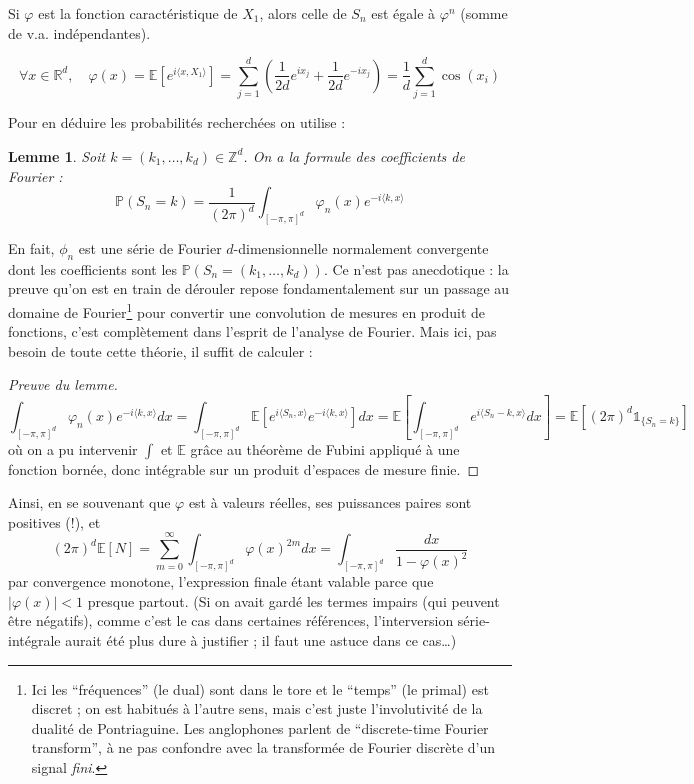 \documentclass[a4paper, 11pt]{article}
\def\Z{\mathbb{Z}}
\def\P{\mathbb{P}}
\def\R{\mathbb{R}}
\def\E{\mathbb{E}}
\def\Indic{\mathbb{1}}
\newtheorem*{lemma}{Lemme}
\begin{document}
Si $\varphi$ est la fonction caractéristique de $X_1$, alors celle de $S_n$
est égale à $\varphi^n$ (somme de v.a. indépendantes).

\[ \forall x \in \R^d,\quad \varphi(x) = \E\left[ e^{i \langle x, X_1 \rangle}
  \right]
  = \sum_{j=1}^d \left( \frac{1}{2d}e^{ix_j} + \frac{1}{2d}e^{-ix_j}\right)
  = \frac{1}{d} \sum_{j=1}^d \cos(x_i) \]

Pour en déduire les probabilités recherchées on utilise :
\begin{lemma} Soit $k = (k_1, \ldots, k_d) \in \Z^d$. On a la formule des
  coefficients de Fourier :
 \[ \displaystyle \P(S_n = k) = \frac{1}{(2\pi)^d} \int_{[-\pi,\pi]^d} \varphi_n(x)e^{-i\langle k,x \rangle} \]
\end{lemma}
En fait, $\phi_n$ est une série de Fourier $d$-dimensionnelle normalement
convergente dont les coefficients sont les $\P(S_n = (k_1, \ldots, k_d))$. Ce
n'est pas anecdotique : la preuve qu'on est en train de dérouler repose
fondamentalement sur un passage au domaine de Fourier\footnote{Ici les
  \enquote{fréquences} (le dual) sont dans le tore et le \enquote{temps} (le
  primal) est discret ; on est habitués à l'autre sens, mais c'est juste
  l'involutivité de la dualité de Pontriaguine. Les anglophones parlent de
  \enquote{discrete-time Fourier transform}, à ne pas confondre avec la
  transformée de Fourier discrète d'un signal \emph{fini}.} pour convertir une
convolution de mesures en produit de fonctions, c'est complètement dans l'esprit
de l'analyse de Fourier. Mais ici, pas besoin de toute cette théorie, il suffit
de calculer :
\begin{proof}[Preuve du lemme]
  \[ \int_{[-\pi,\pi]^d} \varphi_n(x)e^{-i\langle k,x \rangle} dx =
    \int_{[-\pi,\pi]^d} \E\left[ e^{i\langle S_n, x \rangle} e^{-i\langle k,x
        \rangle}\right] dx
    = \E\left[ \int_{[-\pi,\pi]^d} e^{i\langle S_n - k, x \rangle} dx \right]
    = \E\left[ (2\pi)^d \Indic_{\{S_n = k\}} \right] \]
  où on a pu intervenir $\int$ et $\E$ grâce au théorème de Fubini appliqué à
  une fonction bornée, donc intégrable sur un produit d'espaces de mesure finie.
\end{proof}
Ainsi, en se souvenant que $\varphi$ est à valeurs réelles, ses puissances
paires sont positives (!), et
\[ (2\pi)^d \E[N] = \sum_{m=0}^{\infty} \int_{[-\pi,\pi]^d} \varphi(x)^{2m} dx
  = \int_{[-\pi,\pi]^d} \frac{dx}{1 - \varphi(x)^2}\]
par convergence monotone, l'expression finale étant valable parce que
$|\varphi(x)| < 1$ presque partout. (Si on avait gardé les termes impairs (qui
peuvent être négatifs), comme c'est le cas dans certaines références,
l'interversion série-intégrale aurait été plus dure à justifier ; il faut une
astuce dans ce cas…)
\end{document}
